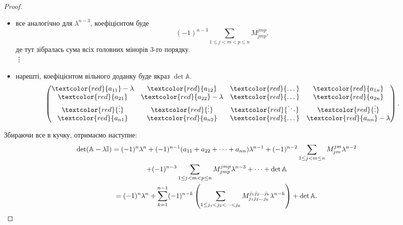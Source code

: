 \documentclass{math_library}
\begin{document}
\begin{proof}
\begin{itemize}[nosep,wide=0pt]
\begin{align*}
\begin{pmatrix}
a_{11} - \textcolor{red}{\lambda} & a_{12} & a_{13} & \dots & a_{1n} \\
a_{21} & \textcolor{red}{a_{22}} - \lambda & a_{23} & \dots & \textcolor{red}{a_{2n}} \\
a_{31} & a_{32} & a_{33} - \textcolor{red}{\lambda} & \dots & a_{3n} \\
\vdots & \vdots & \vdots & \ddots & \vdots \\
a_{n1} & \textcolor{red}{a_{n2}} & a_{n3} & \dots & \textcolor{red}{a_{nn}}-\lambda
\end{pmatrix},\ \dots ,\ \dots, \begin{pmatrix}
a_{11}-\textcolor{red}{\lambda} & a_{12} & \dots & a_{1n} \\
a_{21} & a_{22} - \textcolor{red}{\lambda} & \dots & a_{2n} \\
\vdots & \vdots & \textcolor{red}{\ddots} & \textcolor{red}{\vdots} \\
a_{n1} & a_{n2} & \textcolor{red}{\dots} & \textcolor{red}{a_{nn}}-\lambda
\end{pmatrix}.
\end{align*}
\item все аналогічно для $\lambda^{n-3}$, коефіцієнтом буде
\[
(-1)^{n-3} \displaystyle \sum_{1 \leq j < m < p \leq n} M_{jmp}^{jmp},
\]
де тут зібралась сума всіх головних мінорів 3-го порядку.\\
\vdots
\item нарешті, коефіцієнтом вільного доданку буде якраз $\det \mathbb{A}$.
\[
\begin{pmatrix}
\textcolor{red}{a_{11}}-\lambda & \textcolor{red}{a_{12}} & \textcolor{red}{\dots} & \textcolor{red}{a_{1n}} \\
\textcolor{red}{a_{21}} & \textcolor{red}{a_{22}} - \lambda & \textcolor{red}{\dots} & \textcolor{red}{a_{2n}} \\
\textcolor{red}{\vdots} & \textcolor{red}{\vdots} & \textcolor{red}{\ddots} & \textcolor{red}{\vdots} \\
\textcolor{red}{a_{n1}} & \textcolor{red}{a_{n2}} & \textcolor{red}{\dots} & \textcolor{red}{a_{nn}}-\lambda
\end{pmatrix}.
\]
\end{itemize}
Збираючи все в кучку, отримаємо наступне:
\begin{multline*}
\det (\mathbb{A} - \lambda \mathbb{I}) = \displaystyle (-1)^n \lambda^n + (-1)^{n-1} (a_{11} + a_{22} + \dots + a_{nn}) \lambda^{n-1} + (-1)^{n-2} \sum_{1 \leq j < m \leq n} M_{jm}^{jm} \lambda^{n-2} \\ + (-1)^{n-3} \sum_{1 \leq j < m < p \leq n} M_{jmp}^{jmp} \lambda^{n-3} + \dots + \det \mathbb{A} \\
= (-1)^n \lambda^n + \sum_{k=1}^{n-1} (-1)^{n-k} \left( \sum_{1 \leq j_1 < j_2 < \dots < j_k} M_{j_1j_2\dots j_k}^{j_1j_2\dots j_k} \lambda^{n-k} \right) + \det \mathbb{A}. \qedhere
\end{multline*}
\end{proof}
\end{document}
